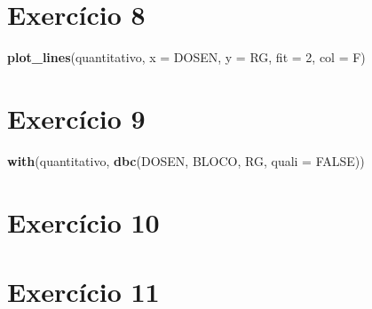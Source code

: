 \documentclass[
]{book}
\newenvironment{Shaded}{\begin{snugshade}}{\end{snugshade}}
\newcommand{\DataTypeTok}[1]{\textcolor[rgb]{0.13,0.29,0.53}{#1}}
\newcommand{\DecValTok}[1]{\textcolor[rgb]{0.00,0.00,0.81}{#1}}
\newcommand{\KeywordTok}[1]{\textcolor[rgb]{0.13,0.29,0.53}{\textbf{#1}}}
\newcommand{\NormalTok}[1]{#1}
\newcommand{\OperatorTok}[1]{\textcolor[rgb]{0.81,0.36,0.00}{\textbf{#1}}}
\newcommand{\OtherTok}[1]{\textcolor[rgb]{0.56,0.35,0.01}{#1}}
\newcommand{\StringTok}[1]{\textcolor[rgb]{0.31,0.60,0.02}{#1}}
\begin{document}
\hypertarget{exerc8}{%
\section{Exercício 8}\label{exerc8}}

\begin{Shaded}
\begin{Highlighting}[]
\KeywordTok{plot_lines}\NormalTok{(quantitativo, }\DataTypeTok{x =}\NormalTok{ DOSEN, }\DataTypeTok{y =}\NormalTok{ RG, }\DataTypeTok{fit =} \DecValTok{2}\NormalTok{, }\DataTypeTok{col =}\NormalTok{ F)}
\end{Highlighting}
\end{Shaded}

\hypertarget{exerc9}{%
\section{Exercício 9}\label{exerc9}}

\begin{Shaded}
\begin{Highlighting}[]
\KeywordTok{with}\NormalTok{(quantitativo, }\KeywordTok{dbc}\NormalTok{(DOSEN, BLOCO, RG, }\DataTypeTok{quali =} \OtherTok{FALSE}\NormalTok{))}
\end{Highlighting}
\end{Shaded}

\hypertarget{exerc10}{%
\section{Exercício 10}\label{exerc10}}

\begin{Shaded}
\end{Shaded}

\hypertarget{exerc11}{%
\section{Exercício 11}\label{exerc11}}
\end{document}
